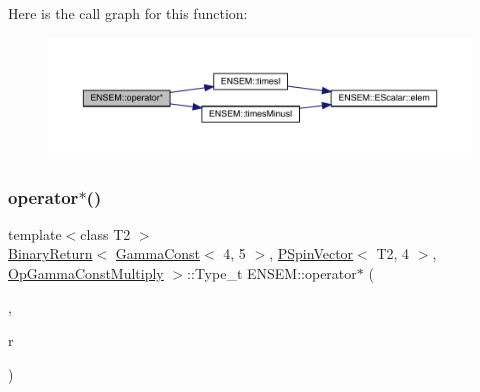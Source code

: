 Here is the call graph for this function\+:\nopagebreak
\begin{figure}[H]
\begin{center}
\leavevmode
\includegraphics[width=350pt]{dd/d6d/group__primspinvector_gaa8429bcfc1a7a130ec526f34f8b08c20_cgraph}
\end{center}
\end{figure}
\mbox{\label{group__primspinvector_ga173eb3594c9d1774c080d3df7116efbd}} 
\subsubsection{\texorpdfstring{operator$\ast$()}{operator*()}\hspace{0.1cm}{\footnotesize\ttfamily [6/32]}}
{\footnotesize\ttfamily template$<$class T2 $>$ \\
\mbox{\hyperlink{structENSEM_1_1BinaryReturn}{Binary\+Return}}$<$ \mbox{\hyperlink{classENSEM_1_1GammaConst}{Gamma\+Const}}$<$ 4, 5 $>$, \mbox{\hyperlink{classENSEM_1_1PSpinVector}{P\+Spin\+Vector}}$<$ T2, 4 $>$, \mbox{\hyperlink{structENSEM_1_1OpGammaConstMultiply}{Op\+Gamma\+Const\+Multiply}} $>$\+::Type\+\_\+t E\+N\+S\+E\+M\+::operator$\ast$ (\begin{DoxyParamCaption}\item[{const \mbox{\hyperlink{classENSEM_1_1GammaConst}{Gamma\+Const}}$<$ 4, 5 $>$ \&}]{,  }\item[{const \mbox{\hyperlink{classENSEM_1_1PSpinVector}{P\+Spin\+Vector}}$<$ T2, 4 $>$ \&}]{r }\end{DoxyParamCaption})\hspace{0.3cm}{\ttfamily [inline]}}

\mbox{\label{group__primspinvector_gad9a09b9039ac73a95c0893a4bfd306c2}} 
